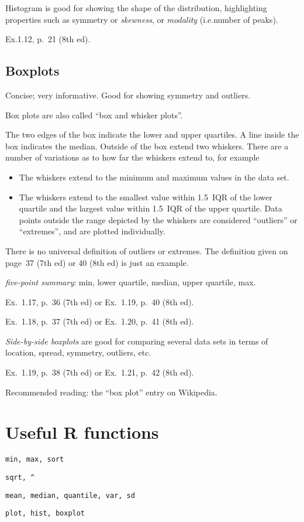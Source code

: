 \documentclass[12pt]{article}
\begin{document}

Histogram is good for showing the shape of the distribution,
highlighting properties such as
symmetry or \emph{skewness}, or \emph{modality} (i.e.\@ number of peaks).

\example Ex.\@ 1.12, p.~21 (8th ed).

\subsection{Boxplots}

Concise; very informative.
Good for showing symmetry and outliers.

Box plots are also called ``box and whisker plots''.

The two edges of the box indicate
the lower and upper quartiles.
A line inside the box indicates the median.
Outside of the box extend two whiskers.
There are a number of variations as to how far the whiskers extend to,
for example
\begin{itemize}
\item The whiskers extend to the minimum and maximum values in the data
set.
\item The whiskers extend to the smallest value within 1.5~IQR
    of the lower quartile and the largest value within 1.5~IQR
    of the upper quartile.
    Data points outside the range depicted by the whiskers
    are considered ``outliers'' or ``extremes'',
    and are plotted individually.
\end{itemize}

\alert
There is no universal definition of outliers or extremes.
The definition given on page~37 (7th ed) or 40 (8th ed) is just an example.


\emph{five-point summary}: min, lower quartile,
median, upper quartile, max.

\example Ex.~1.17, p.~36 (7th ed) or Ex.~1.19, p.~40 (8th ed).

\example Ex.~1.18, p.~37 (7th ed) or Ex.~1.20, p.~41 (8th ed).

\emph{Side-by-side boxplots} are good for comparing several data sets in terms
of location, spread, symmetry, outliers, etc.


\example Ex.~1.19, p.~38 (7th ed) or Ex.~1.21, p.~42 (8th ed).

    Recommended reading: the ``box plot'' entry on Wikipedia.

\section{Useful R functions}

\texttt{min, max, sort}

\texttt{sqrt, \^}

\texttt{mean, median, quantile, var, sd}

\texttt{plot, hist, boxplot}
\end{document}
